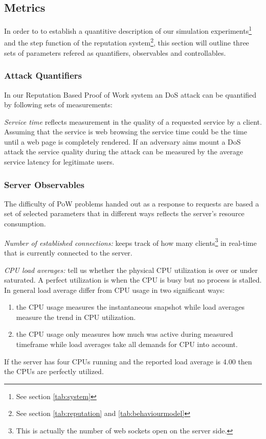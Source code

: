 \subsection{Metrics}

In order to to establish a quantitive description of our simulation experiments\footnote{See section \ref{tab:system}} and the step function of the reputation system\footnote{See section \ref{tab:reputation} and \ref{tab:behaviourmodel}}, this section will outline three sets of parameters refered as quantifiers, observables and controllables. 

\subsubsection{Attack Quantifiers}
In our Reputation Based Proof of Work system an DoS attack can be quantified by following sets of measurements: 

\emph{Service time} reflects measurement in the quality of a requested service by a client. Assuming that the service is web browsing the service time could be the time until a web page is completely rendered. If an adversary aims mount a DoS attack the service quality during the attack can be measured by the average service latency for legitimate users. 

\subsubsection{Server Observables}
The difficulty of PoW problems handed out as a response to requests are based a set of selected parameters that in different ways reflects the server's resource consumption.

\emph{Number of established connections:} keeps track of how many clients\footnote{This is actually the number of web sockets open on the server side.} in real-time that is currently connected to the server.

\emph{CPU load averages:} tell us whether the physical CPU utilization is over or under saturated. A perfect utilization is when the CPU is busy but no process is stalled. In general load average differ from CPU usage in two significant ways:
\begin{enumerate}
\item the CPU usage measures the instantaneous snapshot while load averages measure the trend in CPU utilization.
\item the CPU usage only measures how much was active during measured timeframe while load averages take all demands for CPU into account.
\end{enumerate}
If the server has four CPUs running and the reported load average is 4.00 then the CPUs are perfectly utilized\cite{cpu}.

